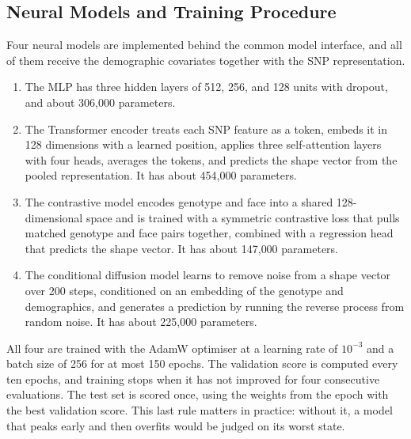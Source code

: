 \subsection{Neural Models and Training Procedure}
Four neural models are implemented behind the common model interface, and all of them receive the demographic covariates together with the SNP representation.
\begin{enumerate}
\item The MLP has three hidden layers of 512, 256, and 128 units with dropout, and about 306{,}000 parameters.
\item The Transformer encoder treats each SNP feature as a token, embeds it in 128 dimensions with a learned position, applies three self-attention layers with four heads, averages the tokens, and predicts the shape vector from the pooled representation. It has about 454{,}000 parameters.
\item The contrastive model encodes genotype and face into a shared 128-dimensional space and is trained with a symmetric contrastive loss that pulls matched genotype and face pairs together, combined with a regression head that predicts the shape vector. It has about 147{,}000 parameters.
\item The conditional diffusion model learns to remove noise from a shape vector over 200 steps, conditioned on an embedding of the genotype and demographics, and generates a prediction by running the reverse process from random noise. It has about 225{,}000 parameters.
\end{enumerate}
All four are trained with the AdamW optimiser at a learning rate of $10^{-3}$ and a batch size of 256 for at most 150 epochs. The validation score is computed every ten epochs, and training stops when it has not improved for four consecutive evaluations. The test set is scored once, using the weights from the epoch with the best validation score. This last rule matters in practice: without it, a model that peaks early and then overfits would be judged on its worst state.

